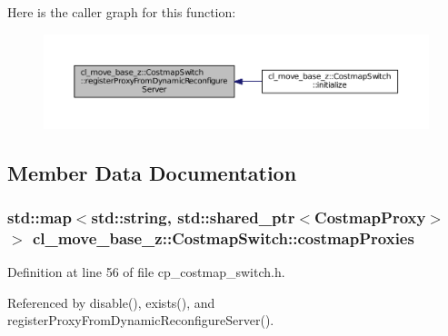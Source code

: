Here is the caller graph for this function\+:
\nopagebreak
\begin{figure}[H]
\begin{center}
\leavevmode
\includegraphics[width=350pt]{classcl__move__base__z_1_1CostmapSwitch_a0d04ca7b655f850ba3107393f1c437cb_icgraph}
\end{center}
\end{figure}




\subsection{Member Data Documentation}
\subsubsection[{\texorpdfstring{costmap\+Proxies}{costmapProxies}}]{\setlength{\rightskip}{0pt plus 5cm}std\+::map$<$std\+::string, std\+::shared\+\_\+ptr$<${\bf Costmap\+Proxy}$>$ $>$ cl\+\_\+move\+\_\+base\+\_\+z\+::\+Costmap\+Switch\+::costmap\+Proxies\hspace{0.3cm}{\ttfamily [private]}}\hypertarget{classcl__move__base__z_1_1CostmapSwitch_a3a574ac1f7f3eff19cdf7ad0e15297e4}{}\label{classcl__move__base__z_1_1CostmapSwitch_a3a574ac1f7f3eff19cdf7ad0e15297e4}


Definition at line 56 of file cp\+\_\+costmap\+\_\+switch.\+h.



Referenced by disable(), exists(), and register\+Proxy\+From\+Dynamic\+Reconfigure\+Server().

